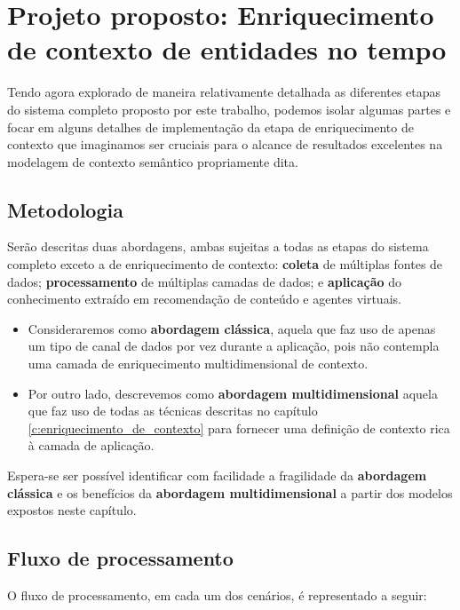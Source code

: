 \chapter{Projeto proposto: Enriquecimento de contexto de entidades no tempo} \label{c:enriquecimento_proposto}

Tendo agora explorado de maneira relativamente detalhada as diferentes etapas do sistema completo proposto por este trabalho, podemos isolar algumas partes e focar em alguns detalhes de implementação da etapa de enriquecimento de contexto que imaginamos ser cruciais para o alcance de resultados excelentes na modelagem de contexto semântico propriamente dita.

\section{Metodologia}

Serão descritas duas abordagens, ambas sujeitas a todas as etapas do sistema completo exceto a de enriquecimento de contexto: \textbf{coleta} de múltiplas fontes de dados; \textbf{processamento} de múltiplas camadas de dados; e \textbf{aplicação} do conhecimento extraído em recomendação de conteúdo e agentes virtuais. 

\begin{itemize}
    \item Consideraremos como \textbf{abordagem clássica}, aquela que faz uso de apenas um tipo de canal de dados por vez durante a aplicação, pois não contempla uma camada de enriquecimento multidimensional de contexto.
    \item  Por outro lado, descrevemos como \textbf{abordagem multidimensional} aquela que faz uso de todas as técnicas descritas no capítulo \ref{c:enriquecimento_de_contexto} para fornecer uma definição de contexto rica à camada de aplicação.
\end{itemize}

Espera-se ser possível identificar com facilidade a fragilidade da \textbf{abordagem clássica} e os benefícios da \textbf{abordagem multidimensional} a partir dos modelos expostos neste capítulo.

\newpage

\section{Fluxo de processamento}

O fluxo de processamento, em cada um dos cenários, é representado a seguir:

